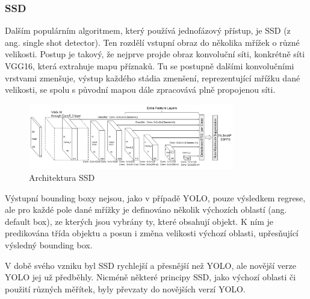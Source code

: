 \subsubsection{SSD}
Dalším populárním algoritmem, který používá jednofázový přístup, je SSD (z ang.
single shot detector). \cite{szegedy:ssd} Ten rozdělí vstupní obraz do několika
mřížek o různé velikosti. Postup je takový, že nejprve projde obraz konvoluční
síti, konkrétně síti VGG16, která extrahuje mapu příznaků. Tu se postupně
dalšími konvolučními vrstvami zmenšuje, výstup každého stádia zmenšení,
reprezentující mřížku dané velikosti, se spolu s původní mapou dále zpracovává
plně propojenou síti.
\begin{figure}[]
    \centering
    \includegraphics[width=0.8\textwidth]{Figures/ssd.png}
    \caption{Architektura SSD \cite{szegedy:ssd}}
    \label{fig:ssd}
\end{figure}

Výstupní bounding boxy nejsou, jako v případě YOLO, pouze výsledkem regrese,
ale pro každé pole dané mřížky je definováno několik výchozích oblastí (ang.
default box), ze kterých jsou vybrány ty, které obsahují objekt. K ním je
predikována třída objektu a posun i změna velikosti výchozí oblasti,
upřesňující výsledný bounding box.

V době svého vzniku byl SSD rychlejší a přesnější než YOLO, ale novější verze
YOLO jej už předběhly. Nicméně některé principy SSD, jako výchozí oblasti či
použití různých měřítek, byly převzaty do novějších verzí YOLO.


\endinput